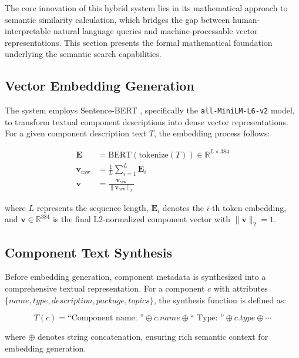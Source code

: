 \documentclass[rnd]{mas_proposal}
\begin{document}
The core innovation of this hybrid system lies in its mathematical approach to semantic similarity calculation, which bridges the gap between human-interpretable natural language queries and machine-processable vector representations. This section presents the formal mathematical foundation underlying the semantic search capabilities.

\subsection{Vector Embedding Generation}

The system employs Sentence-BERT \citep{reimers2019sentencebert}, specifically the \texttt{all-MiniLM-L6-v2} model, to transform textual component descriptions into dense vector representations. For a given component description text $T$, the embedding process follows:

\begin{align}
\mathbf{E} &= \text{BERT}(\text{tokenize}(T)) \in \mathbb{R}^{L \times 384} \label{eq:bert_encoding}\\
\mathbf{v}_{\text{raw}} &= \frac{1}{L} \sum_{i=1}^{L} \mathbf{E}_i \label{eq:mean_pooling}\\
\mathbf{v} &= \frac{\mathbf{v}_{\text{raw}}}{\|\mathbf{v}_{\text{raw}}\|_2} \label{eq:l2_normalization}
\end{align}

where $L$ represents the sequence length, $\mathbf{E}_i$ denotes the $i$-th token embedding, and $\mathbf{v} \in \mathbb{R}^{384}$ is the final L2-normalized component vector with $\|\mathbf{v}\|_2 = 1$.

\subsection{Component Text Synthesis}

Before embedding generation, component metadata is synthesized into a comprehensive textual representation. For a component $c$ with attributes $\{name, type, description, package, topics\}$, the synthesis function is defined as:

\begin{equation}
T(c) = \text{``Component name: ''} \oplus c.name \oplus \text{`` Type: ''} \oplus c.type \oplus \cdots
\end{equation}

where $\oplus$ denotes string concatenation, ensuring rich semantic context for embedding generation.
\end{document}
